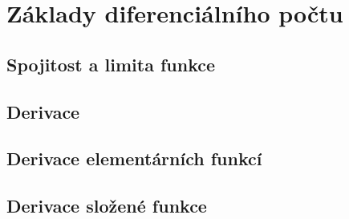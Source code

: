 
\newpage
    \section{Základy diferenciálního počtu}
        \subsection{Spojitost a limita funkce}
        \subsection{Derivace}
        \subsection{Derivace elementárních funkcí}
        \subsection{Derivace složené funkce}
